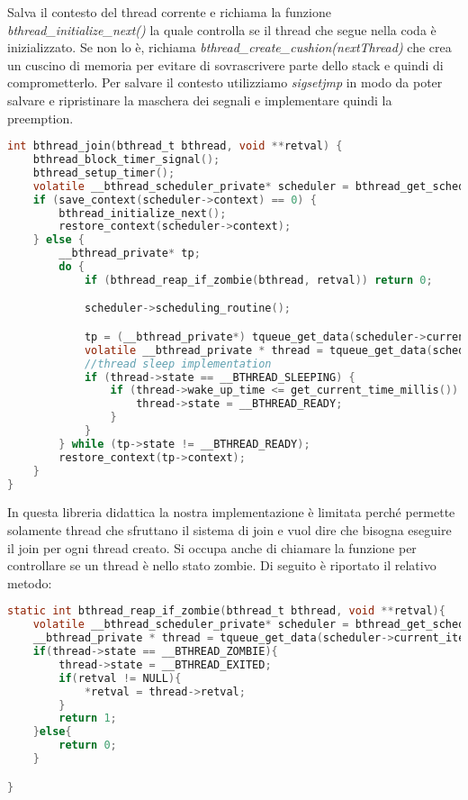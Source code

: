 \documentclass{article}
\begin{document}
Salva il contesto del thread corrente e richiama la funzione \textit{bthread\_initialize\_next()} la quale controlla se il thread che segue nella coda è inizializzato. Se non lo è, richiama \textit{ bthread\_create\_cushion(nextThread)} che crea un cuscino di memoria per evitare di sovrascrivere 
parte dello stack e quindi di comprometterlo. Per salvare il contesto utilizziamo \textit{sigsetjmp} in modo da poter salvare e ripristinare la maschera dei segnali e implementare quindi la preemption.

\begin{lstlisting}[language=C]
int bthread_join(bthread_t bthread, void **retval) {
    bthread_block_timer_signal();
    bthread_setup_timer();
    volatile __bthread_scheduler_private* scheduler = bthread_get_scheduler();
    if (save_context(scheduler->context) == 0) {
        bthread_initialize_next();
        restore_context(scheduler->context);
    } else {
        __bthread_private* tp;
        do {
            if (bthread_reap_if_zombie(bthread, retval)) return 0;

            scheduler->scheduling_routine();

            tp = (__bthread_private*) tqueue_get_data(scheduler->current_item);
            volatile __bthread_private * thread = tqueue_get_data(scheduler->current_item);
            //thread sleep implementation
            if (thread->state == __BTHREAD_SLEEPING) {
                if (thread->wake_up_time <= get_current_time_millis()) {
                    thread->state = __BTHREAD_READY;
                }
            }
        } while (tp->state != __BTHREAD_READY);
        restore_context(tp->context);
    }
}
\end{lstlisting}

In questa libreria didattica la nostra implementazione è limitata perché permette solamente thread che sfruttano il sistema di join e vuol dire che bisogna eseguire il join per ogni thread creato. Si occupa anche di chiamare la funzione per controllare se un thread è nello stato zombie. Di seguito è riportato il relativo metodo:

\begin{lstlisting}[language=C]
static int bthread_reap_if_zombie(bthread_t bthread, void **retval){
    volatile __bthread_scheduler_private* scheduler = bthread_get_scheduler();
    __bthread_private * thread = tqueue_get_data(scheduler->current_item);
    if(thread->state == __BTHREAD_ZOMBIE){
        thread->state = __BTHREAD_EXITED;
        if(retval != NULL){
            *retval = thread->retval;
        }
        return 1;
    }else{
        return 0;
    }

}
\end{lstlisting}
\end{document}

